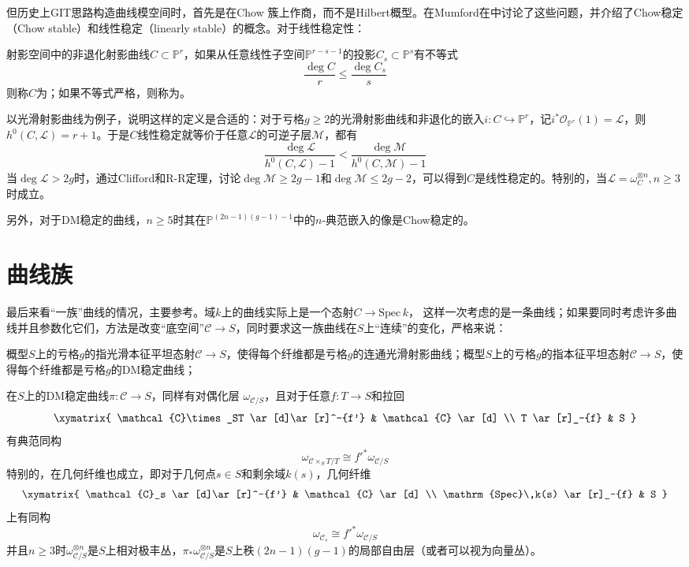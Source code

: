 但历史上GIT思路构造曲线模空间时，首先是在Chow 簇上作商，而不是Hilbert概型。在Mumford在\cite{StabilityofProjectiveVarieties}中讨论了这些问题，并介绍了Chow稳定（Chow stable）和线性稳定（linearly stable）的概念。对于线性稳定性：
\begin{definition}
	射影空间中的非退化射影曲线$ C\subset \mathbb{P}^r $，如果从任意线性子空间$ \mathbb{P}^{r-s-1} $的投影$ C_s\subset \mathbb{P}^s $有不等式
	$$ \frac{\deg C}{r}\leqslant \frac{\deg C_s}{s} $$
	则称$ C $为；如果不等式严格，则称为。
\end{definition}
以光滑射影曲线为例子，说明这样的定义是合适的：对于亏格$ g\geqslant 2 $的光滑射影曲线和非退化的嵌入$ i:C\hookrightarrow \mathbb{P}^r$，记$i^*\mathscr{O}_{\mathbb{P}^r}(1)=\mathscr{L}$，则$ h^0(C,\mathscr{L})=r+1 $。于是$ C $线性稳定就等价于任意$ \mathscr{L} $的可逆子层$ \mathscr{M} $，都有
$$  \frac{\deg \mathscr{L}}{ h^0(C,\mathscr{L})-1} < \frac{\deg \mathscr{M}}{ h^0(C,\mathscr{M})-1} $$
当$ \deg \mathscr{L}>2g $时，通过Clifford和R-R定理，讨论$ \deg \mathscr{M}\geqslant2g-1 $和$ \deg \mathscr{M}\leqslant 2g-2 $，可以得到$ C $是线性稳定的。特别的，当$ \mathscr{L}=\omega_C^{\otimes n},n\geqslant3 $时成立。

另外，对于DM稳定的曲线，$ n\geqslant5 $时其在$ \mathbb{P}^{(2n-1)(g-1)-1} $中的$ n $-典范嵌入的像是Chow稳定的。

\section{曲线族}
最后来看“一族”曲线的情况，主要参考\cite{DM69,GITandModuliofstablecurve}。域$ k $上的曲线实际上是一个态射$ C\to \mathrm{Spec}\,k $， 这样一次考虑的是一条曲线；如果要同时考虑许多曲线并且参数化它们，方法是改变“底空间”$ \mathcal{C}\to S $，同时要求这一族曲线在$ S $上“连续”的变化，严格来说：
\begin{definition}
	概型$ S $上的亏格$ g $的指光滑本征平坦态射$ \mathcal{C}\to S $，使得每个纤维都是亏格$ g $的连通光滑射影曲线；概型$ S $上的亏格$ g $的指本征平坦态射$ \mathcal{C}\to S $，使得每个纤维都是亏格$ g $的DM稳定曲线；
\end{definition}
在$ S $上的DM稳定曲线$ \pi:\mathcal{C}\to S $，同样有对偶化层 $ \omega_{\mathcal{C}/ S} $，且对于任意$ f:T\to S $和拉回
$$ \xymatrix{
	\mathcal{C}\times_ST \ar[d]\ar[r]^-{f'} & \mathcal{C} \ar[d] \\
	T \ar[r]_-{f} & S
} $$
有典范同构
$$ \omega_{\mathcal{C}\times_ST/T}\cong f'^*\omega_{\mathcal{C}/S} $$
特别的，在几何纤维也成立，即对于几何点$ s\in S $和剩余域$ k(s) $，几何纤维
$$ \xymatrix{
	\mathcal{C}_s \ar[d]\ar[r]^-{f'} & \mathcal{C} \ar[d] \\
	\mathrm{Spec}\,k(s) \ar[r]_-{f} & S
} $$
上有同构
$$ \omega_{\mathcal{C}_s}\cong f'^*\omega_{\mathcal{C}/S} $$
并且$ n\geqslant3 $时$ \omega_{\mathcal{C}/ S}^{\otimes n} $是$ S $上相对极丰丛，$ \pi_*\omega_{\mathcal{C}/ S}^{\otimes n} $是$ S $上秩$( 2n-1)(g-1) $的局部自由层（或者可以视为向量丛）。

